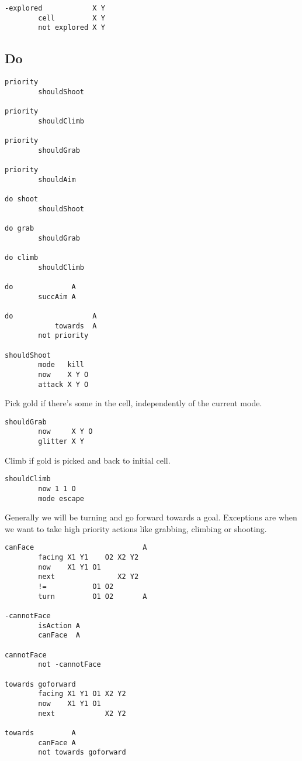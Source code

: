 \begin{verbatim}
-explored            X Y
        cell         X Y
        not explored X Y
\end{verbatim}

\hypertarget{do}{%
\subsection{Do}\label{do}}

\begin{verbatim}
priority
        shouldShoot

priority
        shouldClimb

priority
        shouldGrab

priority
        shouldAim

do shoot
        shouldShoot

do grab
        shouldGrab

do climb
        shouldClimb

do              A
        succAim A

do                   A
            towards  A
        not priority

shouldShoot
        mode   kill
        now    X Y O
        attack X Y O
\end{verbatim}

Pick gold if there's some in the cell, independently of the current
mode.

\begin{verbatim}
shouldGrab
        now     X Y O
        glitter X Y
\end{verbatim}

Climb if gold is picked and back to initial cell.

\begin{verbatim}
shouldClimb
        now 1 1 O
        mode escape
\end{verbatim}

Generally we will be turning and go forward towards a goal. Exceptions
are when we want to take high priority actions like grabbing, climbing
or shooting.

\begin{verbatim}
canFace                          A
        facing X1 Y1    O2 X2 Y2
        now    X1 Y1 O1
        next               X2 Y2
        !=           O1 O2
        turn         O1 O2       A

-cannotFace
        isAction A
        canFace  A

cannotFace
        not -cannotFace

towards goforward
        facing X1 Y1 O1 X2 Y2
        now    X1 Y1 O1
        next            X2 Y2

towards         A
        canFace A
        not towards goforward
\end{verbatim}


